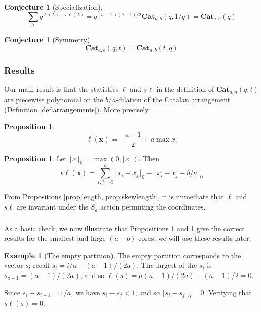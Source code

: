 \documentclass{amsart}[12pt]
\theoremstyle{definition}
\newtheorem{example}[dummy]{Example}
\newtheorem{proposition}[dummy]{Proposition}
\newtheorem{conjecture}[dummy]{Conjecture}
\newcommand{\Cat}{\mathbf{Cat}}
\newcommand{\sk}{s\ell}
\begin{document}
\begin{conjecture}[Specialization]
$$\sum_{\lambda} q^{\ell(\lambda)+\sk(\lambda)}=q^{(a-1)(b-1)/2}\Cat_{a,b}(q,1/q)=\Cat_{a,b}(q)$$
\end{conjecture}

\begin{conjecture}[Symmetry]
$$\Cat_{a,b}(q,t)=\Cat_{a,b}(t,q)$$
\end{conjecture}

\subsubsection{Results}
Our main result is that the statistics $\ell$ and $\sk$ in the definition of $\Cat_{a,n}(q,t)$ are piecewise polynomial on the $b/a$-dilation of the Catalan arrangement (Definition \ref{def:arrangements}).  More precisely:

\begin{proposition}
\label{prop:length}
$$\ell(\mathbf{x})=-\frac{a-1}{2}+a\max x_i$$
\end{proposition}

\begin{proposition}
\label{prop:skewlength}
Let $\lfloor x\rfloor_0=\max\left(0, \lfloor x\rfloor\right)$.
Then
$$\sk(\mathbf{x})=\sum_{i,j=0}^a \lfloor x_i-x_j\rfloor_0 - \lfloor x_i-x_j-b/a\rfloor_0$$
\end{proposition}


From Propositions \ref{prop:length, prop:skewlength}, it is immediate that $\ell$ and $\sk$ are invariant under the $S_a$ action permuting the coordinates. 


\subsubsection{}
As a basic check, we now illustrate that Propositions \ref{prop:length} and \ref{prop:skewlength} give the correct results for the smallest and large $(a-b)$-cores; we will use these results later.

\begin{example}[The empty partition]
The empty partition corresponds to the vector $s$; recall $s_i=i/a-(a-1)/(2a)$.  
  The largest of the $s_i$ is $s_{a-1}=(a-1)/(2a)$, and so $\ell(s)=a(a-1)/(2a)-(a-1)/2=0$.  

Since $s_i-s_{i-1}=1/a$, we have $s_i-s_j<1$, and so $\lfloor s_i-s_j\rfloor_0=0$.  Verifying that $\sk(s)=0$.




\end{example}
\end{document}
